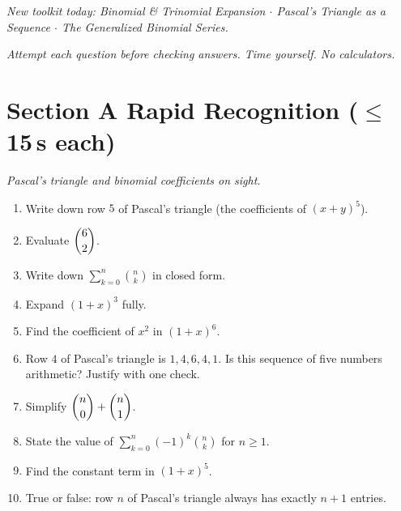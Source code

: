 \documentclass[11pt,a4paper]{article}
\begin{document}
\noindent\textit{New toolkit today: Binomial \& Trinomial Expansion $\cdot$ Pascal's Triangle as a Sequence $\cdot$ The Generalized Binomial Series.}

\vspace{2pt}
\noindent\textit{Attempt each question before checking answers. Time yourself. No calculators.}

\section*{Section A \quad Rapid Recognition \hfill{\normalfont\small($\leq$15\,s each)}}

\noindent\textit{Pascal's triangle and binomial coefficients on sight.}

\begin{enumerate}

\item Write down row $5$ of Pascal's triangle (the coefficients of $(x+y)^5$).

\item Evaluate $\dbinom{6}{2}$.

\item Write down $\displaystyle\sum_{k=0}^{n}\binom nk$ in closed form.

\item Expand $(1+x)^3$ fully.

\item Find the coefficient of $x^2$ in $(1+x)^6$.

\item Row $4$ of Pascal's triangle is $1,4,6,4,1$. Is this sequence of five numbers arithmetic? Justify with one check.

\item Simplify $\dbinom n0+\dbinom n1$.

\item State the value of $\displaystyle\sum_{k=0}^{n}(-1)^k\binom nk$ for $n\geq1$.

\item Find the constant term in $(1+x)^5$.

\item True or false: row $n$ of Pascal's triangle always has exactly $n+1$ entries.

\end{enumerate}
\end{document}
